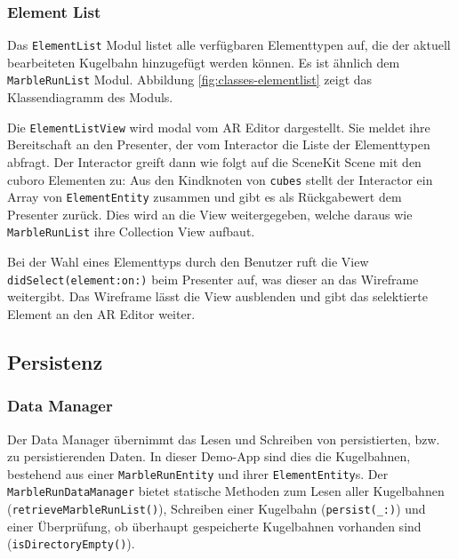 \subsubsection{Element List}

Das \texttt{ElementList} Modul listet alle verfügbaren Elementtypen auf, die der aktuell bearbeiteten Kugelbahn hinzugefügt werden können.
Es ist ähnlich dem \texttt{MarbleRunList} Modul.
Abbildung \ref{fig:classes-elementlist} zeigt das Klassendiagramm des Moduls.


Die \texttt{ElementListView} wird modal vom AR Editor dargestellt.
Sie meldet ihre Bereitschaft an den Presenter, der vom Interactor die Liste der Elementtypen abfragt.
Der Interactor greift dann wie folgt auf die SceneKit Scene mit den cuboro Elementen zu:
Aus den Kindknoten von \texttt{cubes} stellt der Interactor ein Array von \texttt{ElementEntity} zusammen und gibt es als Rückgabewert dem Presenter zurück.
Dies wird an die View weitergegeben, welche daraus wie \texttt{MarbleRunList} ihre Collection View aufbaut.

Bei der Wahl eines Elementtyps durch den Benutzer ruft die View \texttt{didSelect(element:on:)} beim Presenter auf, was dieser an das Wireframe weitergibt.
Das Wireframe lässt die View ausblenden und gibt das selektierte Element an den AR Editor weiter.

\subsection{Persistenz}

\subsubsection{Data Manager} \label{subsub:umsetzung-datamanager}

Der Data Manager übernimmt das Lesen und Schreiben von persistierten, bzw. zu persistierenden Daten.
In dieser Demo-App sind dies die Kugelbahnen, bestehend aus einer \texttt{MarbleRunEntity} und ihrer \texttt{ElementEntity}s.
Der \texttt{MarbleRunDataManager} bietet statische Methoden zum Lesen aller Kugelbahnen (\texttt{retrieveMarbleRunList()}), Schreiben einer Kugelbahn (\texttt{persist(\_:)}) und einer Überprüfung, ob überhaupt gespeicherte Kugelbahnen vorhanden sind (\texttt{isDirectoryEmpty()}).

